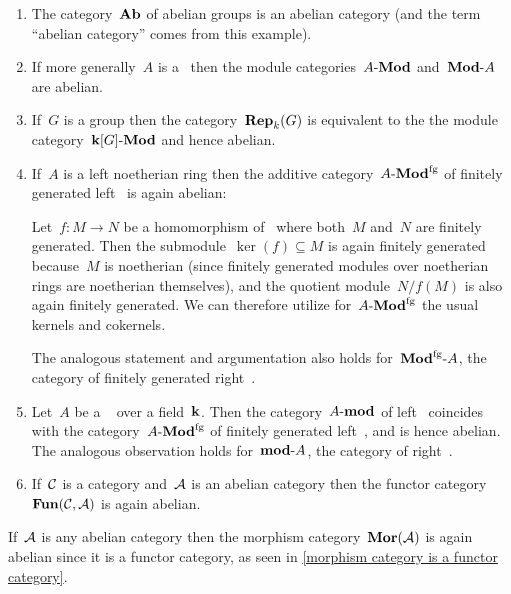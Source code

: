 \begin{example}
  \leavevmode
  \begin{enumerate}
    \item
      The category~$\mathbf{Ab}$ of abelian groups is an abelian category (and the term \enquote{abelian category} comes from this example).
    \item
      If more generally~$A$ is a~{\kalg} then the module categories~$\text{$A$-$\mathbf{Mod}$}$ and~$\text{$\mathbf{Mod}$-$A$}$ are abelian.
    \item
      If~$G$ is a group then the category~$\mathbf{Rep}_{k}(G)$ is equivalent to the the module category~$\text{$\mathbf{k}[G]$-$\mathbf{Mod}$}$ and hence abelian.
    \item
      If~$A$ is a left noetherian ring then the additive category~$\text{$A$-$\mathbf{Mod}^{\mathrm{fg}}$}$ of finitely generated left~{} is again abelian:
      
      Let~$f \colon M \to N$ be a homomorphism of~{} where both~$M$ and~$N$ are finitely generated.
      Then the submodule~$\ker(f) \subseteq M$ is again finitely generated because~$M$ is noetherian (since finitely generated modules over noetherian rings are noetherian themselves), and the quotient module~$N/f(M)$ is also again finitely generated.
      We can therefore utilize for~$\text{$A$-$\mathbf{Mod}^{\mathrm{fg}}$}$ the usual kernels and cokernels.
      
      The analogous statement and argumentation also holds for~$\text{$\mathbf{Mod}^{\mathrm{fg}}$-$A$}$, the category of finitely generated right~{}.
    \item
      Let~$A$ be a {\fd}~{\kalg} over a field~$\mathbf{k}$.
      Then the category~$\text{$A$-$\mathbf{mod}$}$ of {\fd} left~{} coincides with the category~$\text{$A$-$\mathbf{Mod}^{\mathrm{fg}}$}$ of finitely generated left~{}, and is hence abelian.
      The analogous observation holds for~$\text{$\mathbf{mod}$-$A$}$, the category of {\fd} right~{}.
    \item
      If~$\mathcal{C}$ is a category and~$\mathcal{A}$ is an abelian category then the functor category~$\mathbf{Fun}(\mathcal{C}, \mathcal{A})$ is again abelian.
  \end{enumerate}
\end{example}


\begin{example*}
  If~$\mathcal{A}$ is any abelian category then the morphism category~$\mathbf{Mor}(\mathcal{A})$ is again abelian since it is a functor category, as seen in \cref{morphism category is a functor category}.
\end{example*}


